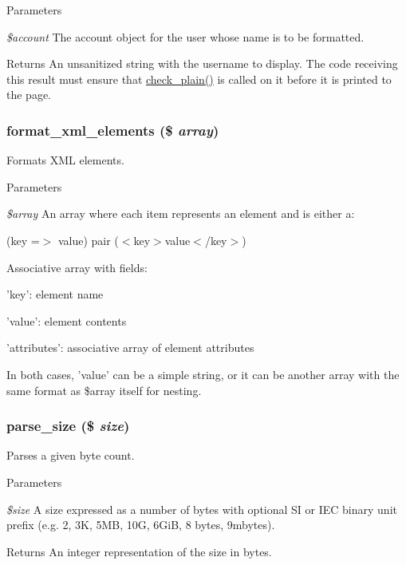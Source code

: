 \begin{DoxyParams}{Parameters}
\item[{\em \$account}]The account object for the user whose name is to be formatted.\end{DoxyParams}
\begin{DoxyReturn}{Returns}
An unsanitized string with the username to display. The code receiving this result must ensure that \hyperlink{group__sanitization_ga76fc67a30fd8d75ddd80565e6e65a13d}{check\_\-plain()} is called on it before it is printed to the page. 
\end{DoxyReturn}
\hypertarget{group__format_gafb344c648e6b63c35950d2889430e4c7}{
\subsubsection[{format\_\-xml\_\-elements}]{\setlength{\rightskip}{0pt plus 5cm}format\_\-xml\_\-elements (\$ {\em array})}}
\label{group__format_gafb344c648e6b63c35950d2889430e4c7}
Formats XML elements.


\begin{DoxyParams}{Parameters}
\item[{\em \$array}]An array where each item represents an element and is either a:
\begin{DoxyItemize}
\item (key =$>$ value) pair ($<$key$>$value$<$/key$>$)
\item Associative array with fields:
\begin{DoxyItemize}
\item 'key': element name
\item 'value': element contents
\item 'attributes': associative array of element attributes
\end{DoxyItemize}
\end{DoxyItemize}\end{DoxyParams}
In both cases, 'value' can be a simple string, or it can be another array with the same format as \$array itself for nesting. \hypertarget{group__format_ga08382023ada29bae2a6a94f22196b066}{
\subsubsection[{parse\_\-size}]{\setlength{\rightskip}{0pt plus 5cm}parse\_\-size (\$ {\em size})}}
\label{group__format_ga08382023ada29bae2a6a94f22196b066}
Parses a given byte count.


\begin{DoxyParams}{Parameters}
\item[{\em \$size}]A size expressed as a number of bytes with optional SI or IEC binary unit prefix (e.g. 2, 3K, 5MB, 10G, 6GiB, 8 bytes, 9mbytes).\end{DoxyParams}
\begin{DoxyReturn}{Returns}
An integer representation of the size in bytes. 
\end{DoxyReturn}
